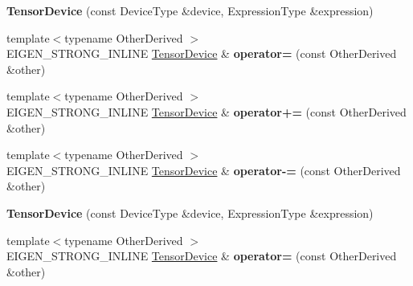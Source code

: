 \begin{DoxyCompactItemize}
\item 
\mbox{\label{class_eigen_1_1_tensor_device_a702c5a2b3f10a3ca17faafc995df0b7e}} 
{\bfseries Tensor\+Device} (const Device\+Type \&device, Expression\+Type \&expression)
\item 
\mbox{\label{class_eigen_1_1_tensor_device_af877c7b8a5132d919d0e78be7b36e3e3}} 
{\footnotesize template$<$typename Other\+Derived $>$ }\\E\+I\+G\+E\+N\+\_\+\+S\+T\+R\+O\+N\+G\+\_\+\+I\+N\+L\+I\+NE \hyperlink{class_eigen_1_1_tensor_device}{Tensor\+Device} \& {\bfseries operator=} (const Other\+Derived \&other)
\item 
\mbox{\label{class_eigen_1_1_tensor_device_a9bc36f8b922b0b2bdf1d99cb592ae988}} 
{\footnotesize template$<$typename Other\+Derived $>$ }\\E\+I\+G\+E\+N\+\_\+\+S\+T\+R\+O\+N\+G\+\_\+\+I\+N\+L\+I\+NE \hyperlink{class_eigen_1_1_tensor_device}{Tensor\+Device} \& {\bfseries operator+=} (const Other\+Derived \&other)
\item 
\mbox{\label{class_eigen_1_1_tensor_device_ab7e44bf8f27d659742a1e6bf1c912f6d}} 
{\footnotesize template$<$typename Other\+Derived $>$ }\\E\+I\+G\+E\+N\+\_\+\+S\+T\+R\+O\+N\+G\+\_\+\+I\+N\+L\+I\+NE \hyperlink{class_eigen_1_1_tensor_device}{Tensor\+Device} \& {\bfseries operator-\/=} (const Other\+Derived \&other)
\item 
\mbox{\label{class_eigen_1_1_tensor_device_a702c5a2b3f10a3ca17faafc995df0b7e}} 
{\bfseries Tensor\+Device} (const Device\+Type \&device, Expression\+Type \&expression)
\item 
\mbox{\label{class_eigen_1_1_tensor_device_af877c7b8a5132d919d0e78be7b36e3e3}} 
{\footnotesize template$<$typename Other\+Derived $>$ }\\E\+I\+G\+E\+N\+\_\+\+S\+T\+R\+O\+N\+G\+\_\+\+I\+N\+L\+I\+NE \hyperlink{class_eigen_1_1_tensor_device}{Tensor\+Device} \& {\bfseries operator=} (const Other\+Derived \&other)
\item 

\end{DoxyCompactItemize}

